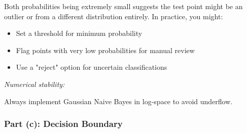 \documentclass[12pt]{article}
\begin{document}
\begin{explanation}
Both probabilities being extremely small suggests the test point might be an outlier or from a different distribution entirely. In practice, you might:
\begin{itemize}
    \item Set a threshold for minimum probability
    \item Flag points with very low probabilities for manual review
    \item Use a "reject" option for uncertain classifications
\end{itemize}

\textit{Numerical stability:}

Always implement Gaussian Naive Bayes in log-space to avoid underflow.
\end{explanation}

\subsubsection{Part (c): Decision Boundary}
\end{document}
